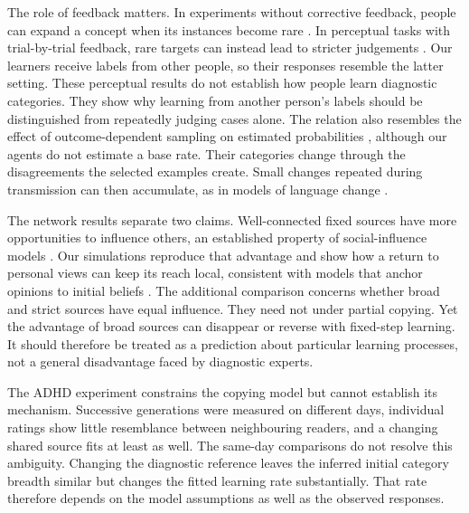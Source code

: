 \documentclass[11pt]{article}
\begin{document}
The role of feedback matters. In experiments without corrective feedback, people can expand a concept when its instances become rare \citep{levari2018,levari2022}. In perceptual tasks with trial-by-trial feedback, rare targets can instead lead to stricter judgements \citep{lyu2021}. Our learners receive labels from other people, so their responses resemble the latter setting. These perceptual results do not establish how people learn diagnostic categories. They show why learning from another person's labels should be distinguished from repeatedly judging cases alone. The relation also resembles the effect of outcome-dependent sampling on estimated probabilities \citep{king2001}, although our agents do not estimate a base rate. Their categories change through the disagreements the selected examples create. Small changes repeated during transmission can then accumulate, as in models of language change \citep{pierrehumbert2001}.

The network results separate two claims. Well-connected fixed sources have more opportunities to influence others, an established property of social-influence models \citep{acemoglu2013,yildiz2013,hunter2022,kitsak2010}. Our simulations reproduce that advantage and show how a return to personal views can keep its reach local, consistent with models that anchor opinions to initial beliefs \citep{friedkin1990}. The additional comparison concerns whether broad and strict sources have equal influence. They need not under partial copying. Yet the advantage of broad sources can disappear or reverse with fixed-step learning. It should therefore be treated as a prediction about particular learning processes, not a general disadvantage faced by diagnostic experts.

The ADHD experiment constrains the copying model but cannot establish its mechanism. Successive generations were measured on different days, individual ratings show little resemblance between neighbouring readers, and a changing shared source fits at least as well. The same-day comparisons do not resolve this ambiguity. Changing the diagnostic reference leaves the inferred initial category breadth similar but changes the fitted learning rate substantially. That rate therefore depends on the model assumptions as well as the observed responses.
\end{document}
